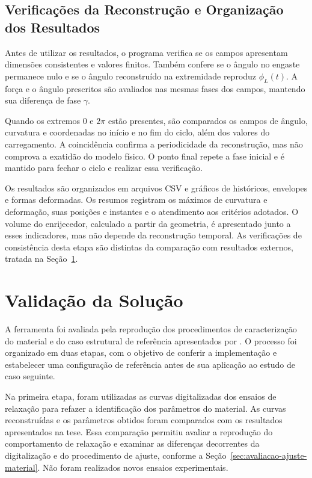 \documentclass[arial,centeredequations,english,brazilian,oneside,section=TITLE]{ifes8}
\begin{document}
\subsection{Verificações da Reconstrução e Organização dos Resultados}
\label{sec:verificacoes-reconstrucao-linear}

Antes de utilizar os resultados, o programa verifica se os campos apresentam
dimensões consistentes e valores finitos. Também confere se o ângulo no
engaste permanece nulo e se o ângulo reconstruído na extremidade reproduz
$\phi_L(t)$. A força e o ângulo prescritos são avaliados nas mesmas fases
dos campos, mantendo sua diferença de fase $\gamma$.

Quando os extremos 0 e $2\pi$ estão presentes, são comparados os campos de
ângulo, curvatura e coordenadas no início e no fim do ciclo, além dos valores
do carregamento. A coincidência confirma a periodicidade da reconstrução,
mas não comprova a exatidão do modelo físico. O ponto final repete a fase
inicial e é mantido para fechar o ciclo e realizar essa verificação.

Os resultados são organizados em arquivos CSV e gráficos de históricos,
envelopes e formas deformadas. Os resumos registram os máximos de curvatura
e deformação, suas posições e instantes e o atendimento aos critérios
adotados. O volume do enrijecedor, calculado a partir da geometria, é apresentado
junto a esses indicadores, mas não depende da reconstrução temporal.
As verificações de consistência desta etapa são distintas da comparação
com resultados externos, tratada na Seção~\ref{sec:validacao-da-solucao}.

\section{Validação da Solução}
\label{sec:validacao-da-solucao}

A ferramenta foi avaliada pela reprodução dos procedimentos de caracterização do
material e do caso estrutural de referência apresentados por
. O processo foi organizado em duas etapas, com o objetivo
de conferir a implementação e estabelecer uma configuração de referência antes
de sua aplicação ao estudo de caso seguinte.

Na primeira etapa, foram utilizadas as curvas digitalizadas dos ensaios de
relaxação para refazer a identificação dos parâmetros do material. As curvas
reconstruídas e os parâmetros obtidos foram comparados com os resultados
apresentados na tese. Essa comparação permitiu avaliar a reprodução do
comportamento de relaxação e examinar as diferenças decorrentes da digitalização
e do procedimento de ajuste, conforme a
Seção~\ref{sec:avaliacao-ajuste-material}. Não foram realizados novos ensaios
experimentais.
\end{document}
